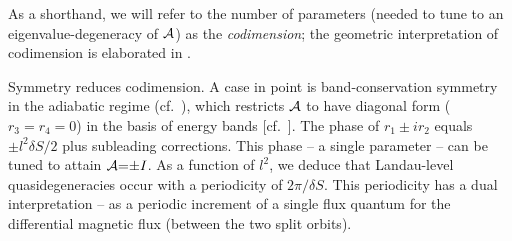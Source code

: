 \documentclass[aps, showpacs, twocolumn, notitlepage, superscriptaddress]{revtex4-1}
\begin{document}
As a shorthand, we will refer to the number of parameters (needed to tune to an eigenvalue-degeneracy of ${\cal A}$) as the \textit{codimension}; the geometric interpretation of codimension is elaborated in .

Symmetry reduces codimension. A case in point is band-conservation symmetry in the adiabatic regime (cf.\ ), which restricts ${\cal A}$ to have diagonal form  ($r_3{=}r_4{=}0$) in the basis of energy bands [cf.\ ]. The phase of $r_1{\pm}ir_2$ equals ${\pm} l^2\delta S/2$ plus subleading corrections. This  phase -- a single parameter --  can be  tuned to attain ${\cal A}{=}{\pm}I$. As a function of $l^2$, we deduce that Landau-level quasidegeneracies occur with a periodicity of $2\pi/\delta S$. This periodicity  has a dual interpretation -- as a periodic increment of a single flux quantum for the differential magnetic flux (between the two split orbits).

\end{document}
